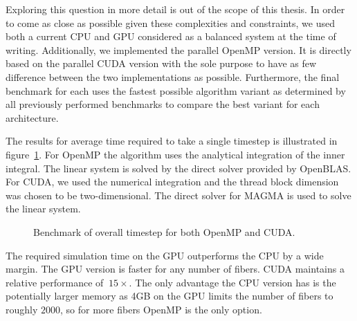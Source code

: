 \documentclass[a4paper,11pt]{kth-mag}
\begin{document}
Exploring this question in more detail is out of the scope of this thesis. In order to come as close as possible given these complexities and constraints, we used both a current CPU and GPU considered as a balanced system at the time of writing. Additionally, we implemented the parallel OpenMP version. It is directly based on the parallel CUDA version with the sole purpose to have as few difference between the two implementations as possible. Furthermore, the final benchmark for each uses the fastest possible algorithm variant as determined by all previously performed benchmarks to compare the best variant for each architecture.

The results for average time required to take a single timestep is illustrated in figure~\ref{fig:overall}. For OpenMP the algorithm uses the analytical integration of the inner integral. The linear system is solved by the direct solver provided by OpenBLAS. For CUDA, we used the numerical integration and the thread block dimension was chosen to be two-dimensional. The direct solver for MAGMA is used to solve the linear system.

\begin{figure}[!htbp]
  \centering
  \caption{Benchmark of overall timestep for both OpenMP and CUDA.}
  \label{fig:overall}
\end{figure}

The required simulation time on the GPU outperforms the CPU by a wide margin. The GPU version is faster for any number of fibers. CUDA maintains a relative performance of $~15×$. The only advantage the CPU version has is the potentially larger memory as 4GB on the GPU limits the number of fibers to roughly $2000$, so for more fibers OpenMP is the only option.
\end{document}
